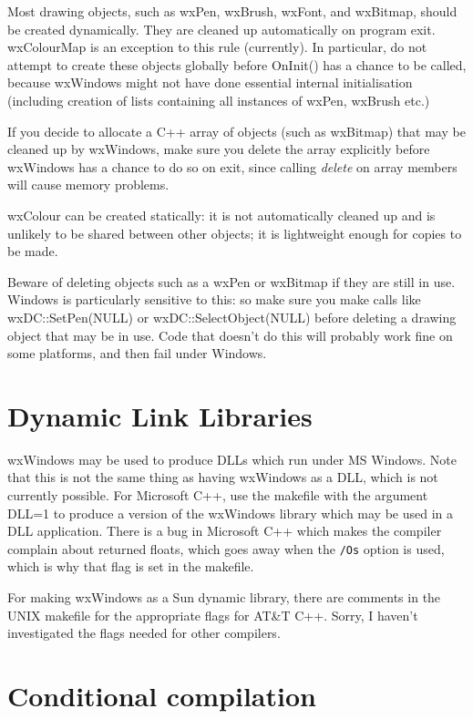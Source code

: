 Most drawing objects, such as wxPen, wxBrush, wxFont, and wxBitmap, should be
created dynamically. They are cleaned up automatically on program exit.
wxColourMap is an exception to this rule (currently). In particular,
do not attempt to create these objects globally before OnInit() has a chance
to be called, because wxWindows might not have done essential internal initialisation
(including creation of lists containing all instances of wxPen, wxBrush etc.)

If you decide to allocate a C++ array of objects (such as wxBitmap) that may
be cleaned up by wxWindows, make sure you delete the array explicitly
before wxWindows has a chance to do so on exit, since calling {\it delete} on
array members will cause memory problems.

wxColour can be created statically: it is not automatically cleaned
up and is unlikely to be shared between other objects; it is lightweight
enough for copies to be made.

Beware of deleting objects such as a wxPen or wxBitmap if they are still in use.
Windows is particularly sensitive to this: so make sure you
make calls like wxDC::SetPen(NULL) or wxDC::SelectObject(NULL) before deleting
a drawing object that may be in use. Code that doesn't do this will probably work
fine on some platforms, and then fail under Windows.

\section{Dynamic Link Libraries}

wxWindows may be used to produce DLLs which run under MS Windows. Note that
this is not the same thing as having wxWindows as a DLL, which is not
currently possible. For Microsoft C++, use the makefile with the argument DLL=1 to produce
a version of the wxWindows library which may be used in a DLL application.
There is a bug in Microsoft C++ which makes the compiler complain about returned floats,
which goes away when the {\tt /Os} option is used, which is why that flag is
set in the makefile.

For making wxWindows as a Sun dynamic library, there are comments in the
UNIX makefile for the appropriate flags for AT\&T C++. Sorry, I haven't
investigated the flags needed for other compilers.

\section{Conditional compilation}

